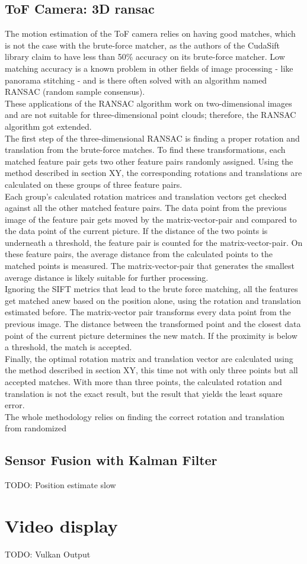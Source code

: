 \subsection{ToF Camera: 3D ransac}
\label{sec:ToFPosition_RANSAC}
The motion estimation of the ToF camera relies on having good matches, which is not the case with the brute-force matcher, as the authors of the CudaSift library claim to have less than 50\% accuracy on its brute-force matcher.\cite{cudaSiftRepo} Low matching accuracy is a known problem in other fields of image processing - like panorama stitching - and is there often solved with an algorithm named RANSAC (random sample consensus).\\
These applications of the RANSAC algorithm work on two-dimensional images and are not suitable for three-dimensional point clouds; therefore, the RANSAC algorithm got extended.\\
The first step of the three-dimensional RANSAC is finding a proper rotation and translation from the brute-force matches. To find these transformations, each matched feature pair gets two other feature pairs randomly assigned. Using the method described in section XY, the corresponding rotations and translations are calculated on these groups of three feature pairs.\\
Each group's calculated rotation matrices and translation vectors get checked against all the other matched feature pairs. The data point from the previous image of the feature pair gets moved by the matrix-vector-pair and compared to the data point of the current picture. If the distance of the two points is underneath a threshold, the feature pair is counted for the matrix-vector-pair. On these feature pairs, the average distance from the calculated points to the matched points is measured. The matrix-vector-pair that generates the smallest average distance is likely suitable for further processing.\\
Ignoring the SIFT metrics that lead to the brute force matching, all the features get matched anew based on the position alone, using the rotation and translation estimated before. The matrix-vector pair transforms every data point from the previous image. The distance between the transformed point and the closest data point of the current picture determines the new match. If the proximity is below a threshold, the match is accepted.\\
Finally, the optimal rotation matrix and translation vector are calculated using the method described in section XY, this time not with only three points but all accepted matches. With more than three points, the calculated rotation and translation is not the exact result, but the result that yields the least square error.\cite{SVD_ETH}\\
The whole methodology relies on finding the correct rotation and translation from randomized 






\subsection{Sensor Fusion with Kalman Filter}
\label{sec:SensorFusion}
TODO: Position estimate slow
\section{Video display}
\label{sec:VideoDisplay}
TODO: Vulkan Output